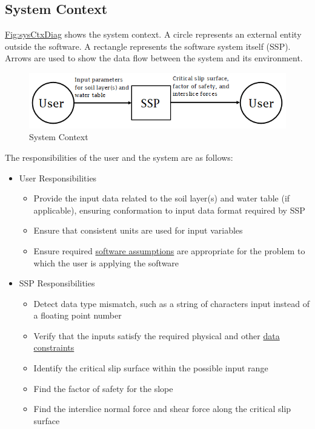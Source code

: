 \documentclass[12pt]{article}
\begin{document}
\subsection{System Context}
\label{Sec:SysContext}
\hyperref[Figure:sysCtxDiag]{Fig:sysCtxDiag} shows the system context. A circle represents an external entity outside the software. A rectangle represents the software system itself (SSP). Arrows are used to show the data flow between the system and its environment.

\begin{figure}[H]
\begin{center}
\includegraphics[width=\textwidth]{../../../../datafiles/ssp/SystemContextFigure.png}
\caption{System Context}
\label{Figure:sysCtxDiag}
\end{center}
\end{figure}
The responsibilities of the user and the system are as follows:

\begin{itemize}
\item{User Responsibilities}
\begin{itemize}
\item{Provide the input data related to the soil layer(s) and water table (if applicable), ensuring conformation to input data format required by SSP}
\item{Ensure that consistent units are used for input variables}
\item{Ensure required \hyperref[Sec:Assumps]{software assumptions} are appropriate for the problem to which the user is applying the software}
\end{itemize}
\item{SSP Responsibilities}
\begin{itemize}
\item{Detect data type mismatch, such as a string of characters input instead of a floating point number}
\item{Verify that the inputs satisfy the required physical and other \hyperref[Sec:DataConstraints]{data constraints}}
\item{Identify the critical slip surface within the possible input range}
\item{Find the factor of safety for the slope}
\item{Find the interslice normal force and shear force along the critical slip surface}
\end{itemize}
\end{itemize}
\end{document}
